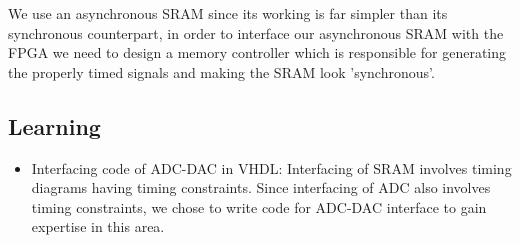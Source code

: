 \documentclass[../../main.tex]{subfiles}
\begin{document}
We use an asynchronous SRAM since its working is far simpler than its synchronous counterpart, in order to interface our asynchronous SRAM with the FPGA we need to design a memory controller which is responsible for generating the properly timed signals and making the SRAM look ’synchronous’.\\


\subsection{Learning}
\begin{itemize}
    \item Interfacing code of ADC-DAC in VHDL: Interfacing of SRAM involves timing diagrams having timing constraints. Since interfacing of ADC also involves timing constraints, we chose to write code for ADC-DAC interface to gain expertise in this area.
    

\end{itemize}
\end{document}
